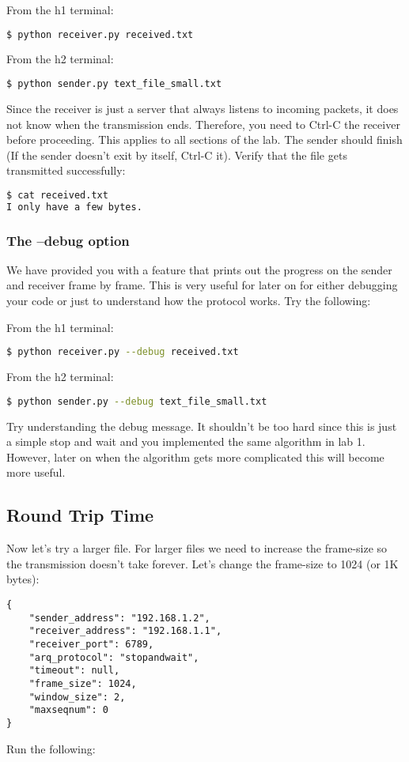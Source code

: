 \documentclass[11pt]{article}
\begin{document}
From the h1 terminal:
\begin{lstlisting}[language=bash]
$ python receiver.py received.txt
\end{lstlisting}
From the h2 terminal:
\begin{lstlisting}[language=bash]
$ python sender.py text_file_small.txt
\end{lstlisting}
Since the receiver is just a server that always listens to incoming packets, it does not know when the transmission ends. Therefore, you need to Ctrl-C the receiver before proceeding. This applies to all sections of the lab.
The sender should finish (If the sender doesn't exit by itself, Ctrl-C it). Verify that the file gets transmitted successfully:
\begin{lstlisting}[language=bash]
$ cat received.txt
I only have a few bytes.
\end{lstlisting}

\subsubsection {The --debug option}
We have provided you with a feature that prints out the progress on the sender and receiver frame by frame. This is very useful for later on for either debugging your code or just to understand how the protocol works. Try the following:

From the h1 terminal:
\begin{lstlisting}[language=bash]
$ python receiver.py --debug received.txt
\end{lstlisting}
From the h2 terminal:
\begin{lstlisting}[language=bash]
$ python sender.py --debug text_file_small.txt
\end{lstlisting}

Try understanding the debug message. It shouldn't be too hard since this is just a simple stop and wait and you implemented the same algorithm in lab 1. However, later on when the algorithm gets more complicated this will become more useful.

\subsection{Round Trip Time}
Now let's try a larger file. For larger files we need to increase the frame-size so the transmission doesn't take forever. Let's change the frame-size to 1024 (or 1K bytes):
\begin{lstlisting}[caption={Configuration For Large File}]
{
    "sender_address": "192.168.1.2",
    "receiver_address": "192.168.1.1",
    "receiver_port": 6789,
    "arq_protocol": "stopandwait",
    "timeout": null,
    "frame_size": 1024,
    "window_size": 2,
    "maxseqnum": 0
}
\end{lstlisting}
Run the following:
\end{document}

